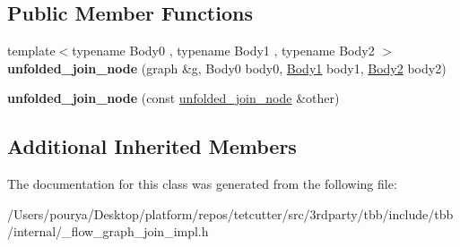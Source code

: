 \subsection*{Public Member Functions}
\begin{DoxyCompactItemize}
\item 
\hypertarget{classinternal_1_1unfolded__join__node_3_013_00_01tag__matching__port_00_01OutputTuple_00_01tag__matching_01_4_a520225105ce6528033f62af637e48a08}{}{\footnotesize template$<$typename Body0 , typename Body1 , typename Body2 $>$ }\\{\bfseries unfolded\+\_\+join\+\_\+node} (graph \&g, Body0 body0, \hyperlink{structBody1}{Body1} body1, \hyperlink{structBody2}{Body2} body2)\label{classinternal_1_1unfolded__join__node_3_013_00_01tag__matching__port_00_01OutputTuple_00_01tag__matching_01_4_a520225105ce6528033f62af637e48a08}

\item 
\hypertarget{classinternal_1_1unfolded__join__node_3_013_00_01tag__matching__port_00_01OutputTuple_00_01tag__matching_01_4_af222ae7b6436205061879eb44e14eaf1}{}{\bfseries unfolded\+\_\+join\+\_\+node} (const \hyperlink{classinternal_1_1unfolded__join__node}{unfolded\+\_\+join\+\_\+node} \&other)\label{classinternal_1_1unfolded__join__node_3_013_00_01tag__matching__port_00_01OutputTuple_00_01tag__matching_01_4_af222ae7b6436205061879eb44e14eaf1}

\end{DoxyCompactItemize}
\subsection*{Additional Inherited Members}


The documentation for this class was generated from the following file\+:\begin{DoxyCompactItemize}
\item 
/\+Users/pourya/\+Desktop/platform/repos/tetcutter/src/3rdparty/tbb/include/tbb/internal/\+\_\+flow\+\_\+graph\+\_\+join\+\_\+impl.\+h\end{DoxyCompactItemize}
